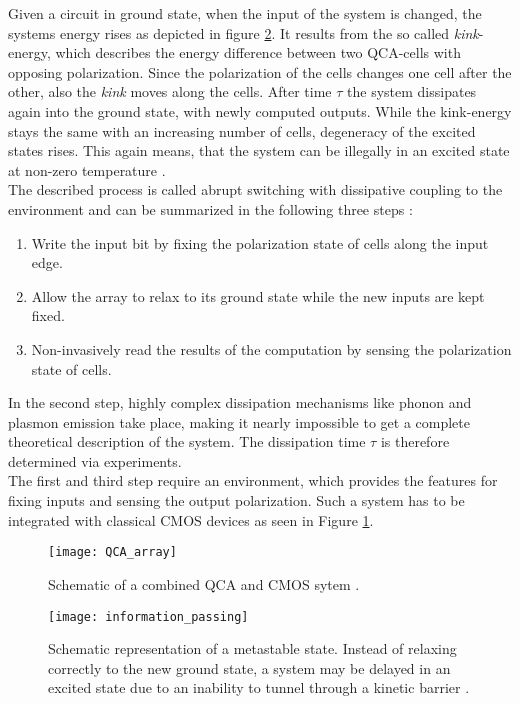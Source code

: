 Given a circuit in ground state, when the input of the system is changed, the systems energy rises as depicted in figure \ref{fig:info_pass}. It results from the so called \textit{kink}-energy, which describes the energy difference between two QCA-cells with opposing polarization. Since the polarization of the cells changes one cell after the other, also the \textit{kink} moves along the cells. After time $\tau$ the system dissipates again into the ground state, with newly computed outputs. While the kink-energy stays the same with an increasing number of cells, degeneracy of the excited states rises. This again means, that the system can be illegally in an excited state at non-zero temperature \cite{lent1994quantum}.\\

The described process is called abrupt switching with dissipative coupling to the environment and can be summarized in the following three steps \cite{lent1994quantum}:
\begin{enumerate}
	\item Write the input bit by fixing the polarization state of
	cells along the input edge.
	\item Allow the array to relax to its ground state while the
	new inputs are kept fixed.
	\item Non-invasively read the results of the computation
	by sensing the polarization state of cells.
\end{enumerate}

In the second step, highly complex dissipation mechanisms like phonon and plasmon emission take place, making it nearly impossible to get a complete theoretical description of the system. The dissipation time $\tau$ is therefore determined via experiments.\\
The first and third step require an environment, which provides the features for fixing inputs and sensing the output polarization. Such a system has to be integrated with classical CMOS devices as seen in Figure \ref{fig:QCA_array}.\\

\begin{figure}
	\centering
	\texttt{[image: QCA\_array]}
	\caption{Schematic of a combined QCA and CMOS sytem \cite{lent1994quantum}.} 
	\label{fig:QCA_array}
\end{figure}

\begin{figure}
	\centering
	\texttt{[image: information\_passing]}
	\caption{Schematic representation of a metastable state. Instead
		of relaxing correctly to the new ground state, a system may be
		delayed in an excited state due to an inability to tunnel through a
		kinetic barrier \cite{lent1997device}.} 
	\label{fig:info_pass}
\end{figure}


